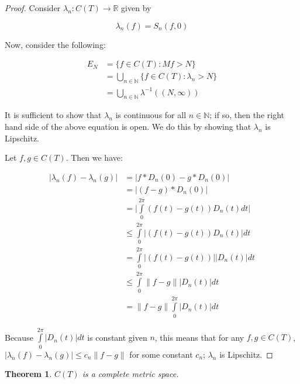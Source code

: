 \documentclass{amsart}
\newcommand{\la}{\lambda}
\newcommand{\N}{\mathbb{N}}
\newcommand{\R}{\mathbb{R}}
\newcommand{\absval}[1]{\lvert #1 \rvert}
\newcommand{\norm}[1]{\|#1\|}
\newtheorem{thm}{Theorem}[section]
\theoremstyle{definition}
\begin{document}
\begin{proof}
Consider $\la_n: C(T) \to \R$ given by

\begin{displaymath}
\la_n(f) = S_n(f,0)
\end{displaymath}

Now, consider the following:

\begin{align*}
E_N &= \{f \in C(T): Mf> N\} \\
&= \bigcup\limits_{n \in \N} \{f \in C(T) : \la_n > N\}\\
&= \bigcup\limits_{n \in \N} \la^{-1}((N, \infty))
\end{align*}

It is sufficient to show that $\la_n$ is continuous for all $n \in \N$; if so, then the right hand side of the above equation is open.
We do this by showing that $\la_n$ is Lipschitz.

Let $f, g \in C(T)$. Then we have:

\begin{align*}
\absval{\la_n(f) - \la_n(g)} &= \absval{f \ast D_n(0) - g \ast D_n(0)} \\
&= \absval{(f-g) \ast D_n(0)} \\
&= \absval{\int\limits_0^{2\pi} (f(t)-g(t))D_n(t)dt} \\
&\leq \int\limits_0^{2\pi} \absval{(f(t)-g(t))D_n(t)}dt \\
&= \int\limits_0^{2\pi} \absval{(f(t)-g(t))}\absval{D_n(t)}dt \\
&\leq \int\limits_0^{2\pi} \norm{f-g}\absval{D_n(t)}dt \\
&= \norm{f-g} \int\limits_0^{2\pi} \absval{D_n(t)}dt
\end{align*}

Because $\int\limits_0^{2\pi} \absval{D_n(t)}dt$ is constant given $n$, this means that for any $f,g \in C(T)$, $\absval{\la_n(f) - \la_n(g)} \leq c_n \norm{f-g}$ for some constant $c_n$; $\la_n$ is Lipschitz.

\end{proof}

\begin{thm}
$C(T)$ is a complete metric space.
\end{thm}
\end{document}

